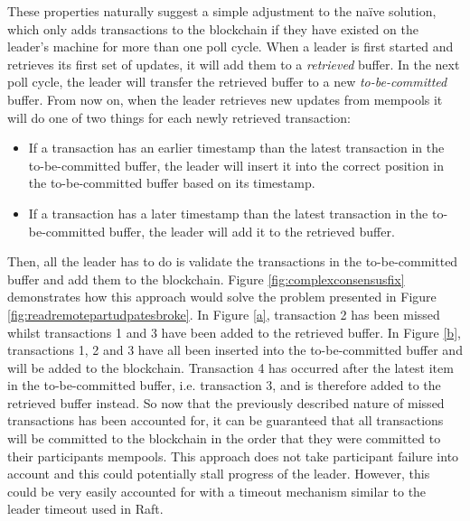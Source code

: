 \documentclass[12pt,a4paper,twoside,openright]{report}
\begin{document}
	These properties naturally suggest a simple adjustment to the na\"{i}ve solution, which only adds transactions to the blockchain if they have existed on the leader's machine for more than one poll cycle.
	When a leader is first started and retrieves its first set of updates, it will add them to a \textit{retrieved} buffer.
	In the next poll cycle, the leader will transfer the retrieved buffer to a new \textit{to-be-committed} buffer.
	From now on, when the leader retrieves new updates from mempools it will do one of two things for each newly retrieved transaction:
	\begin{itemize}
		\item If a transaction has an earlier timestamp than the latest transaction in the to-be-committed buffer, the leader will insert it into the correct position in the to-be-committed buffer based on its timestamp.
		\item If a transaction has a later timestamp than the latest transaction in the to-be-committed buffer, the leader will add it to the retrieved buffer.
	\end{itemize}
	Then, all the leader has to do is validate the transactions in the to-be-committed buffer and add them to the blockchain.
	Figure \ref{fig:complexconsensusfix} demonstrates how this approach would solve the problem presented in Figure \ref{fig:readremotepartudpatesbroke}.
	In Figure \ref{a}, transaction 2 has been missed whilst transactions 1 and 3 have been added to the retrieved buffer. 
	In Figure \ref{b}, transactions 1, 2 and 3 have all been inserted into the to-be-committed buffer and will be added to the blockchain.
	Transaction 4 has occurred after the latest item in the to-be-committed buffer, i.e. transaction 3, and is therefore added to the retrieved buffer instead. 
	So now that the previously described nature of missed transactions has been accounted for, it can be guaranteed that all transactions will be committed to the blockchain in the order that they were committed to their participants mempools.
	This approach does not take participant failure into account and this could potentially stall progress of the leader. 
	However, this could be very easily accounted for with a timeout mechanism similar to the leader timeout used in Raft.\\
\end{document}
